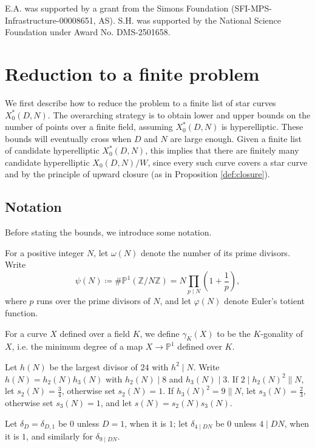 \documentclass[12pt]{amsart}
\renewcommand{\P}{\mathbb{P}}
\newcommand{\Z}{\mathbb{Z}}
\numberwithin{equation}{subsection}
\theoremstyle{plain}\newtheorem{ithm}{Theorem}
\theoremstyle{plain}\newtheorem{iprop}[ithm]{Proposition}
\theoremstyle{definition}
\theoremstyle{remark}
\newcommand{\Curve}[2]{X_0({#1},{#2})} %
\newcommand{\StarCurve}[2]{X_0^*({#1},{#2})} %
\newcommand{\gon}[2]{\gamma_{#2}(#1)}
\begin{document}
E.A. was supported by a grant from the Simons Foundation (SFI-MPS-Infrastructure-00008651, AS).
S.H. was supported by the National Science Foundation under Award No. DMS-2501658.

\section{Reduction to a finite problem}
\label{sec:reduction}
We first describe how to reduce the problem to a finite list of star curves $\StarCurve{D}{N}$.
The overarching strategy is to obtain lower and upper bounds on the number of points over a finite field, assuming $\StarCurve{D}{N}$ is hyperelliptic. 
These bounds will eventually cross when $D$ and $N$ are large enough.
Given a finite list of candidate hyperelliptic $\StarCurve{D}{N}$, this implies that there are finitely many candidate hyperelliptic $\Curve{D}{N}/W$, since every such curve covers a star curve and by the principle of upward closure (as in Proposition \ref{def:closure}).

\subsection{Notation} Before stating the bounds, we introduce some notation.

For a positive integer $N$, let $\omega(N)$ denote the number of its prime divisors. Write 
\begin{equation} \label{eqn:P1}
\psi(N) \coloneqq \# \P^1(\Z / N \Z) = N \prod_{p \mid N} \left ( 1 + \frac{1}{p} \right),
\end{equation}
where $p$ runs over the prime divisors of $N$,
and let $\varphi(N)$ denote Euler's totient function.

For a curve $X$ defined over a field $K$, we define $\gon{X}{K}$ to be the $K$-gonality of $X$, i.e. the minimum degree of a map $X \to \P^1$ defined over $K$. 

Let $h(N)$ be the largest divisor of $24$ with $h^2 \mid N$. Write $h(N) = h_2(N) h_3(N)$ with $h_2(N) \mid 8$ and $h_3(N) \mid 3$. If $2 \mid h_2(N)^2 \parallel N$, let $s_2(N) = \tfrac{3}{4}$, otherwise set $s_2(N) = 1$. If $h_3(N)^2 = 9 \parallel N$, let $s_3(N) = \tfrac{2}{3}$, otherwise set $s_3(N) = 1$, and let $s(N) = s_2(N) s_3(N)$.

Let $\delta_D = \delta_{D,1}$ be $0$ unless $D = 1$, when it is $1$; 
let $\delta_{4 \mid DN}$ be $0$ unless $4 \mid DN$, when it is $1$, and similarly for $\delta_{9 \mid DN}$. 
\end{document}
